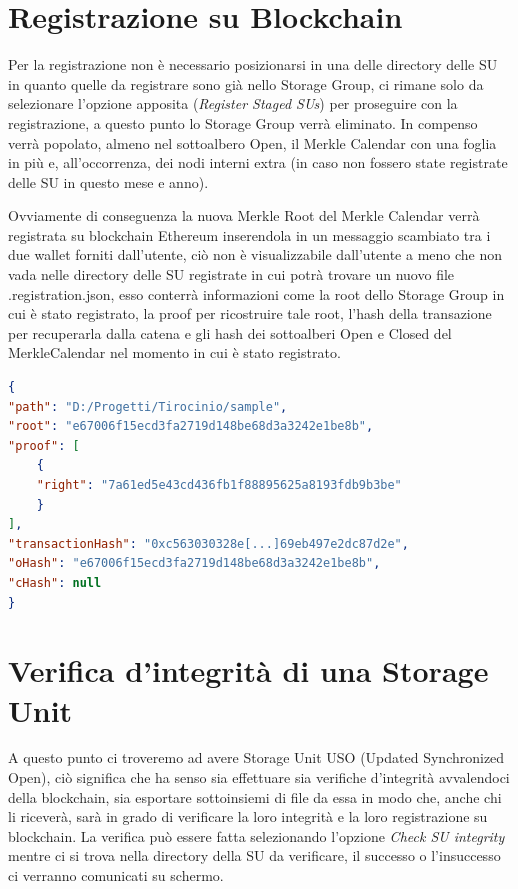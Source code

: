 \section{Registrazione su Blockchain}
\label{sub:regbc}
Per la registrazione non è necessario posizionarsi in una delle directory delle SU
in quanto quelle da registrare sono già nello Storage Group, ci rimane solo
da selezionare l'opzione apposita (\emph{Register Staged SUs}) per proseguire
con la registrazione, a questo punto lo Storage Group verrà eliminato.
In compenso verrà popolato, almeno nel sottoalbero Open, il Merkle Calendar con una foglia
in più e, all'occorrenza, dei nodi interni extra (in caso non fossero state
registrate delle SU in questo mese e anno).

Ovviamente di conseguenza la nuova Merkle Root del Merkle Calendar verrà registrata su
blockchain Ethereum inserendola in un messaggio scambiato tra i due wallet forniti dall'utente,
ciò non è visualizzabile dall'utente a meno che non vada nelle directory delle SU registrate 
in cui potrà trovare un nuovo file \textsf{.registration.json}, esso conterrà informazioni
come la root dello Storage Group in cui è stato registrato, la proof per ricostruire tale root,
l'hash della transazione per recuperarla dalla catena e gli hash dei sottoalberi Open e Closed
del MerkleCalendar nel momento in cui è stato registrato.

\singlespacing
\begin{lstlisting}[language=json,firstnumber=1]
{ 
"path": "D:/Progetti/Tirocinio/sample",
"root": "e67006f15ecd3fa2719d148be68d3a3242e1be8b",
"proof": [ 
    {
    "right": "7a61ed5e43cd436fb1f88895625a8193fdb9b3be"
    } 
],
"transactionHash": "0xc563030328e[...]69eb497e2dc87d2e",
"oHash": "e67006f15ecd3fa2719d148be68d3a3242e1be8b",
"cHash": null
}  
\end{lstlisting}
\onehalfspacing

\newpage

\section{Verifica d'integrità di una Storage Unit}

A questo punto ci troveremo ad avere Storage Unit USO (Updated Synchronized Open), ciò
significa che ha senso sia effettuare sia verifiche d'integrità avvalendoci della blockchain,
sia esportare sottoinsiemi di file da essa in modo che, anche chi li riceverà, sarà
in grado di verificare la loro integrità e la loro registrazione su blockchain.
La verifica può essere fatta selezionando l'opzione \emph{Check SU integrity}
mentre ci si trova nella directory della SU da verificare, il successo o
l'insuccesso ci verranno comunicati su schermo.

